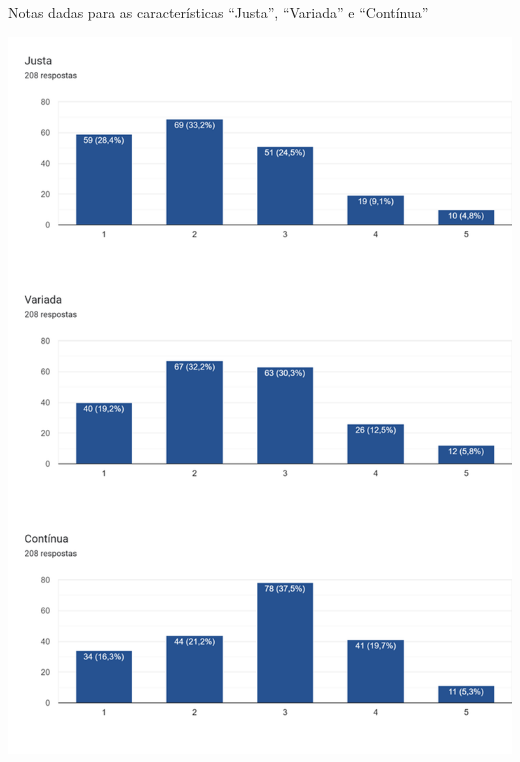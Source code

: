 
\begin{MyCenteredFigure}
  \caption{Notas dadas para as características ``Justa'', ``Variada'' e ``Contínua''}
  \label{fig:6.0-Opiniao-1_3}
  \includegraphics[width=\textwidth]{files/img/Forms/6.0-Opiniao-1_3}
\end{MyCenteredFigure}

